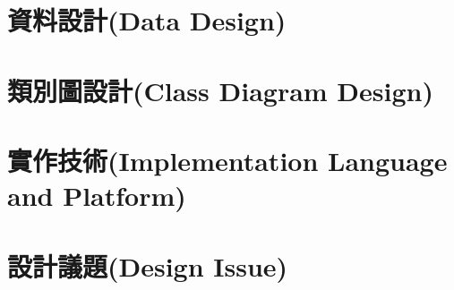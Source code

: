 \documentclass{article}
\begin{document}
\section[資料設計(DATA DESIGN)]{資料設計(Data Design)}

\newpage

\section[類別圖設計(CLASS DIAGRAM DESIGN)]{類別圖設計(Class Diagram Design)}

\newpage

\section[實作技術(IMPLEMENTATION LANGUAGE AND PLATFORM)]{實作技術(Implementation Language and Platform)}

\newpage

\section[設計議題(DESIGN ISSUE)]{設計議題(Design Issue)}
\end{document}
